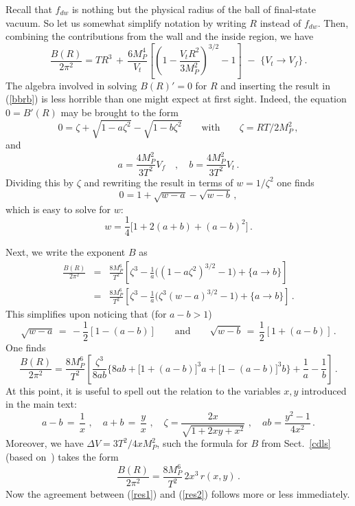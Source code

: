 \documentclass[12pt]{article}
\newcommand{\be}{\begin{equation}}
\newcommand{\ee}{\end{equation}}
\newcommand{\bea}{\begin{eqnarray}}
\newcommand{\eea}{\end{eqnarray}}
\numberwithin{equation}{section}
\begin{document}
Recall that $f_{dw}$ is nothing but the physical radius of the ball of final-state vacuum. So let us somewhat simplify notation by writing $R$ instead of $f_{dw}$. Then, combining the contributions from the wall and the inside region, we have
\be
\frac{B(R)}{2\pi^2}=TR^3\,+\,\frac{6M_P^4}{V_t}\left[\left(1-\frac{V_t R^2}{3M_P^2}\right)^{3/2}-1\right] \,\,-\,\,\Bigg\{ V_t\to V_f\Bigg\}\,.\label{bbrb}
\ee
The algebra involved in solving $B(R)'=0$ for $R$ and inserting the result in (\ref{bbrb}) is less horrible than one might expect at first sight. Indeed, the equation $0=B'(R)$ may be brought to the form
\be
0=\zeta+\sqrt{1-a\zeta^2}-\sqrt{1-b\zeta^2}\qquad \mbox{with} \qquad \zeta=RT/2M_P^2\,,
\ee
and 
\be
a=\frac{4M_P^2}{3T^2}V_f\quad,\quad
b=\frac{4M_P^2}{3T^2}V_t\,.
\ee
Dividing this by $\zeta$ and rewriting the result in terms of $w=1/\zeta^2$ one finds 
\be
0=1+\sqrt{w-a}-\sqrt{w-b}\,,
\ee
which is easy to solve for $w$:
\be
w=\frac{1}{4}\big[1+2(a+b)+(a-b)^2\big]\,.
\ee

Next, we write the exponent $B$ as
\bea
\frac{B(R)}{2\pi^2}&=&\frac{8M_P^6}{T^2}\left[
\zeta^3-\frac{1}{a}\Big((1-a\zeta^2)^{3/2}-1\Big)+\Big\{
a\to b\Big\}
\right]
\\
&=& \frac{8M_P^6}{T^2}\left[\zeta^3-\frac{1}{a}
\Big(\zeta^3(w-a)^{3/2}-1\Big)+\Big\{
a\to b\Big\}\right]\,.
\eea
This simplifies upon noticing that (for $a-b>1$)
\be
\sqrt{w-a}\,=\,-\frac{1}{2}[1-(a-b)]\qquad \mbox{and}\qquad 
\sqrt{w-b}\,=\,\frac{1}{2}[1+(a-b)]\,.
\ee
One finds
\be 
\frac{B(R)}{2\pi^2} = \frac{8M_P^6}{T^2}\left[\frac{\zeta^3}{8ab}\Big\{8ab+\big[1+(a-b)\big]^3a+\big[1-(a-b)\big]^3b\Big\}+\frac{1}{a}-\frac{1}{b}\right]\,.\label{res1}
\ee
At this point, it is useful to spell out the relation to the variables $x,y$ introduced in the main text:
\be
a-b\,=\,\frac{1}{x}\,\,,\quad a+b\,=\,\frac{y}{x}\,\,,\quad
\zeta=\frac{2x}{\sqrt{1+2xy+x^2}}\,\,,\quad
ab=\frac{y^2-1}{4x^2}\,.
\ee
Moreover, we have $\Delta V=3T^2/4xM_P^2$, such the formula for $B$ from Sect.~\ref{cdls} (based on~\cite{Parke:1982pm}) takes the form
\be
\frac{B(R)}{2\pi^2} = \frac{8 M_P^6}{T^2}\,2x^3\,r(x,y)\,.
\label{res2}
\ee
Now the agreement between (\ref{res1}) and (\ref{res2}) follows more or less immediately.
\end{document}
